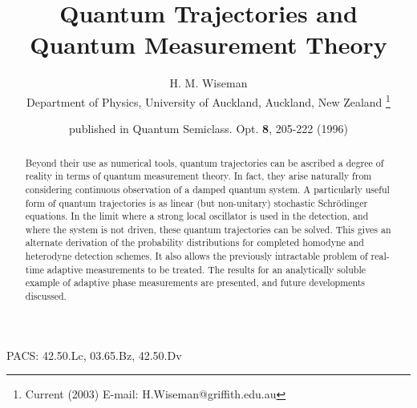 \documentclass[12pt]{article}
\begin{document}
\title{Quantum Trajectories and Quantum Measurement Theory}  
\author{H. M. Wiseman  \\ Department of Physics, University of Auckland,
 Auckland, New Zealand \footnote{Current (2003) E-mail: H.Wiseman@griffith.edu.au}}
\date{published in Quantum Semiclass. Opt. {\bf 8}, 205-222 (1996)}
\maketitle


\newcommand{\beq}{\begin{equation}}
\newcommand{\eeq}{\end{equation}}
\newcommand{\bqa}{\begin{eqnarray}}
\newcommand{\eqa}{\end{eqnarray}}
\newcommand{\nn}{\nonumber}
\newcommand{\dg}{^\dagger}
\newcommand{\smallfrac}[2]{\mbox{$\frac{#1}{#2}$}}
\newcommand{\ket}[1]{| {#1} \rangle}
\newcommand{\bra}[1]{\langle {#1} |}
\newcommand{\sch}{Schr\"odinger }
\newcommand{\schs}{Schr\"odinger's }
\newcommand{\hei}{Heisenberg }
\newcommand{\heis}{Heisenberg's }
\newcommand{\half}{\smallfrac{1}{2}}
\newcommand{\bl}{{\bigl(}}
\newcommand{\br}{{\bigr)}}
\newcommand{\ito}{It\^o }
\newcommand{\str}{Stratonovich }
\newcommand{\bfi}{{\bf I}_{[0,t)}}


\begin{abstract}
Beyond their use as numerical tools, quantum trajectories can be ascribed a
degree of reality in terms of quantum measurement theory. In fact, they arise
naturally from considering continuous observation of a damped quantum system. A
particularly useful form of quantum trajectories is as linear (but non-unitary)
stochastic \sch equations. In the limit where a strong local oscillator is used
in the detection, and where the system is not driven, these quantum trajectories
can be solved. This gives an alternate derivation of the probability
distributions for completed homodyne and heterodyne detection schemes. It also
allows the previously intractable problem of real-time adaptive measurements to
be treated. The results for an analytically soluble example of adaptive phase
measurements are presented, and future developments discussed.


\end{abstract}

PACS: 42.50.Lc, 03.65.Bz, 42.50.Dv

\end{document}
